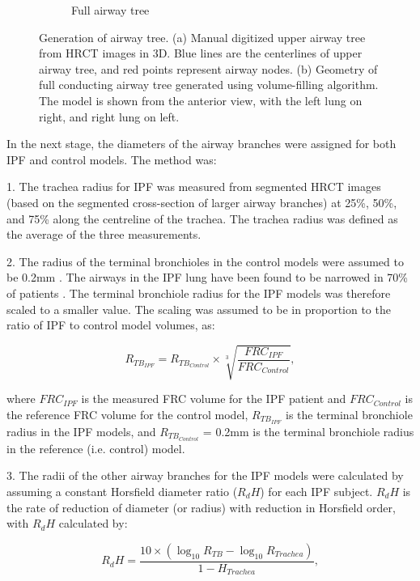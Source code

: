 \begin{figure}[htbp]
\begin{subfigure}{.425\linewidth}
  \caption{Full airway tree}
  \label{fig:AirwayGeneration-b} 
\end{subfigure}
\caption{Generation of airway tree. (a) Manual digitized upper airway tree from HRCT images in 3D. Blue lines are the centerlines of upper airway tree, and red points represent airway nodes. (b) Geometry of full conducting airway tree generated using volume-filling algorithm. The
model is shown from the anterior view, with the left lung on right, and right lung on left.} 
\label{fig:AirwayGeneration}
\end{figure}

In the next stage, the diameters of the airway branches were assigned for both IPF and control models. The method was:

1. The trachea radius for IPF was measured from segmented HRCT images (based on the segmented cross-section of larger airway branches) at 25\%, 50\%, and 75\% along the centreline of the trachea. The trachea radius was defined as the average of the three measurements.

2. The radius of the terminal bronchioles in the control models were assumed to be 0.2mm \citep{horsfield1976diameter}. The airways in the IPF lung have been found to be narrowed in 70\% of patients \citep{crystal1976idiopathic}. The terminal bronchiole radius for the IPF models was therefore scaled to a smaller value. The scaling was assumed to be in proportion to the ratio of IPF to control model volumes, as:

\begin{equation}
 \label{eq:NarrowedTerminalRadius}
 R_{{TB}_{IPF}} = R_{{TB}_{Control}} \times \sqrt[3]{\frac{FRC_{IPF}}{FRC_{Control}}},
\end{equation}

\noindent where $FRC_{IPF}$ is the measured FRC volume for the IPF patient and $FRC_{Control}$ is the reference FRC volume for the control model, $R_{{TB}_{IPF}}$ is the terminal bronchiole radius in the IPF models, and $R_{{TB}_{Control}}$ = 0.2mm is the terminal bronchiole radius in the reference (i.e. control) model.  

3. The radii of the other airway branches for the IPF models were calculated by assuming a constant Horsfield diameter ratio ($R_dH$) for each IPF subject. $R_dH$ is the rate of reduction of diameter (or radius) with reduction in Horsfield order, with $R_dH$ calculated by:

\begin{equation}
 \label{eq:HorsfieldRadiusRatio}
 R_dH = \frac{10 \times (\log_{10}R_{TB} - \log_{10}R_{Trachea})}{1-H_{Trachea}},
\end{equation}

